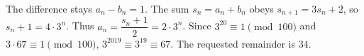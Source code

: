 The difference stays $a_n-b_n=1$. The sum $s_n=a_n+b_n$ obeys $s_{n+1}=3s_n+2$, so $s_n+1=4\cdot3^n$. Thus $a_n=\dfrac{s_n+1}{2}=2\cdot3^n$. Since $3^{20}\equiv1\pmod{100}$ and $3\cdot67\equiv1\pmod{100}$, $3^{2019}\equiv3^{19}\equiv67$. The requested remainder is $\boxed{34}$.
